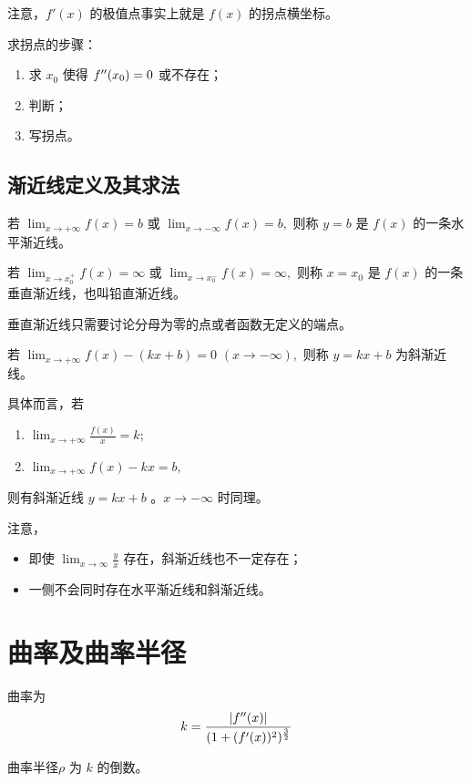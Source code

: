 注意，$ f'(x) $ 的极值点事实上就是 $ f(x) $ 的拐点横坐标。

求拐点的步骤：\begin{enumerate}
    \item 求 $ x_0 $ 使得 $ f^{\prime\prime}(x_0)=0 $ 或不存在；
    \item 判断；
    \item 写拐点。
\end{enumerate}

\subsection{渐近线定义及其求法}


若 $ {\displaystyle\lim_{x\rightarrow +\infty}}f(x)=b $
或 $ {\displaystyle\lim_{x\rightarrow -\infty}}f(x) = b, $ 
则称 $ y=b $ 是 $ f(x) $ 的一条水平渐近线。


若 $ {\displaystyle\lim_{x\rightarrow x_0^+}}f(x)=\infty $ 
或 $ {\displaystyle\lim_{x\rightarrow x_0^-}}f(x)=\infty, $ 则称 $ x=x_0 $ 是 $ f(x) $ 的一条垂直渐近线，也叫铅直渐近线。

垂直渐近线只需要讨论分母为零的点或者函数无定义的端点。


若 $ {\displaystyle\lim_{x\rightarrow +\infty}}f(x)-(kx+b)=0 $ $ (x\rightarrow-\infty), $ 则称
$ y=kx+b $ 为斜渐近线。

具体而言，若\begin{enumerate}
    \item $ {\displaystyle\lim_{x\rightarrow +\infty}}\frac{f(x)}{x}=k; $ 
    \item $ {\displaystyle\lim_{x\rightarrow +\infty}}f(x)-kx = b, $ 
\end{enumerate}
则有斜渐近线 $ y=kx+b $ 。$ x\rightarrow-\infty $ 时同理。

注意，
\begin{itemize}
    \item 即使 $ {\displaystyle\lim_{x\rightarrow \infty}} \frac{y}{x} $ 存在，斜渐近线也不一定存在；
    \item 一侧不会同时存在水平渐近线和斜渐近线。
\end{itemize}

\section{曲率及曲率半径}

曲率为$$
   k=\frac{|f^{\prime\prime}(x)|}{(1+(f'(x))^2)^{\frac{3}{2}}}
$$ 

曲率半径$ \rho $ 为 $ k $ 的倒数。
